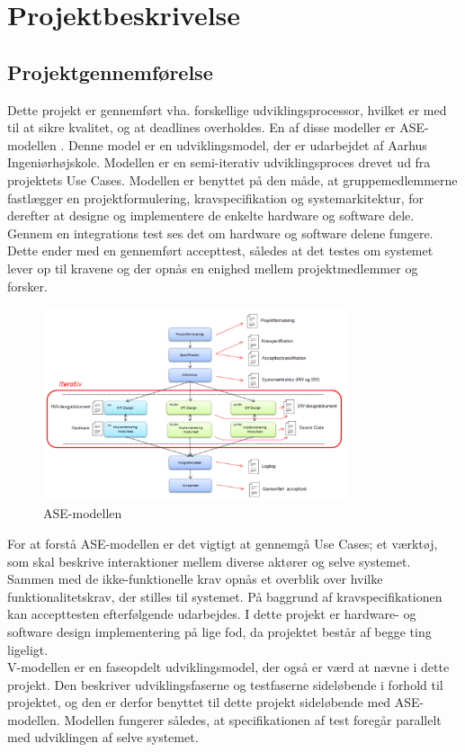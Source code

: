 \chapter{Projektbeskrivelse}
\section{Projektgennemførelse}
 
Dette projekt er gennemført vha. forskellige udviklingsprocessor, hvilket er med til at sikre kvalitet, og at deadlines overholdes. En af disse modeller er ASE-modellen \cite{ISE}. Denne model er en udviklingsmodel, der er udarbejdet af Aarhus Ingeniørhøjskole. Modellen er en semi-iterativ udviklingsproces drevet ud fra projektets Use Cases. Modellen er benyttet på den måde, at gruppemedlemmerne fastlægger en projektformulering, kravspecifikation og systemarkitektur, for derefter at designe og implementere de enkelte hardware og software dele. Gennem en integrations test ses det om hardware og software delene fungere.  
Dette ender med en gennemført accepttest, således at det testes om systemet lever op til kravene og der opnås en enighed mellem projektmedlemmer og forsker.
\begin{figure}[H]
	\centering
	\includegraphics[width=0.8\textwidth]{Figurer/AseModellen}
	\caption{ASE-modellen}
	\label{fig:ASE_model}
\end{figure}
For at forstå ASE-modellen er det vigtigt at gennemgå Use Cases; et værktøj, som skal beskrive interaktioner mellem diverse aktører og selve systemet. Sammen med de ikke-funktionelle krav opnås et overblik over hvilke funktionalitetskrav, der stilles til systemet. På baggrund af kravspecifikationen kan accepttesten efterfølgende udarbejdes. I dette projekt er hardware- og software design implementering på lige fod, da projektet består af begge ting ligeligt.\\
\newline
V-modellen \cite{ISE} er en faseopdelt udviklingsmodel, der også er værd at nævne i dette projekt. Den beskriver udviklingsfaserne og testfaserne sideløbende i forhold til projektet, og den er derfor benyttet til dette projekt sideløbende med ASE-modellen. Modellen fungerer således, at specifikationen af test foregår parallelt med udviklingen af selve systemet.

